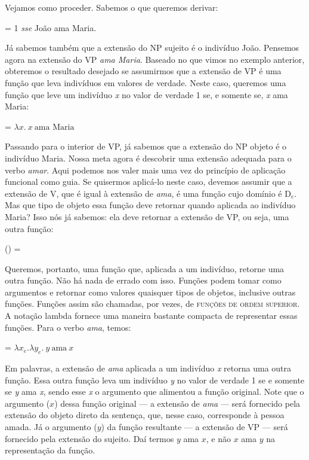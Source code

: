 Vejamos como proceder. Sabemos o que queremos derivar:

\begin{exe}
	\ex {} = 1 \textit{sse} João ama Maria.
\end{exe}

\noindent Já sabemos também que a extensão do NP sujeito é o
indivíduo João. Pensemos agora na extensão do VP
\textit{ama Maria}. Baseado no que vimos no exemplo anterior, obteremos o
resultado desejado se assumirmos que a extensão de VP é uma
função que leva indivíduos em valores de verdade. Neste caso,
queremos uma função que leve um indivíduo \textit{x} no valor de
verdade 1
se, e somente se, \textit{x} ama Maria:

\begin{exe}
	\ex {} = $\lambda x.\ x\ \text{ama Maria}$
\end{exe}

\n Passando para o interior de VP, já sabemos que a extensão do NP
objeto é o indivíduo Maria. Nossa meta agora é descobrir uma
extensão adequada para o verbo \textit{amar}. Aqui podemos nos valer mais
uma vez do princípio de aplicação funcional como guia. Se
quisermos aplicá-lo neste caso, devemos assumir que a extensão de
V, que é igual à extensão de \textit{ama}, é uma função cujo domínio é
D$_{e}$. Mas que tipo de objeto essa função deve retornar quando
aplicada ao indivíduo Maria? Isso nós já sabemos: ela deve
retornar a extensão de VP, ou seja, uma outra função:

\begin{exe}
	\ex {}() = 
\end{exe}

\noindent Queremos, portanto, uma função que, aplicada a um indivíduo, retorne uma outra função. Não há nada de errado com isso. Funções podem tomar como argumentos e retornar como valores quaisquer tipos de objetos, inclusive outras funções. Funções assim são chamadas, por vezes, de \textsc{funções de ordem superior}. A notação lambda fornece uma maneira bastante compacta de representar essas funções. Para o verbo \textit{ama}, temos:

\begin{exe}
	\ex {} = $\lambda x_{e}.\lambda y_{e}.\ y\ \text{ama}\ x$
\end{exe}

\noindent Em palavras, a extensão de \textit{ama} aplicada a um indivíduo
\textit{x} retorna uma outra função. Essa outra função leva um indivíduo \textit{y}
no valor de verdade 1 se e somente se \textit{y} ama \textit{x}, sendo esse \textit{x} o argumento que alimentou a função original. Note que o argumento ($x$) dessa função original --- a extensão de \textit{ama} --- será fornecido pela extensão do objeto direto da sentença, que, nesse caso, corresponde à pessoa amada. Já o argumento ($y$) da função resultante --- a extensão de VP --- será fornecido pela extensão do sujeito. Daí termos $y$ ama $x$, e não $x$ ama $y$ na representação da função.

